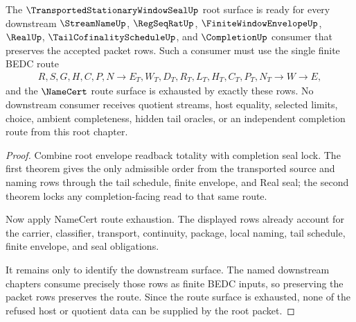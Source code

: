 \begin{theorem}
\label{thm:transported-stationary-window-seal-downstream-route-readiness}
The $\TransportedStationaryWindowSealUp$ root surface is ready for every downstream $\StreamNameUp$, $\RegSeqRatUp$, $\FiniteWindowEnvelopeUp$, $\RealUp$, $\TailCofinalityScheduleUp$, and $\CompletionUp$ consumer that preserves the accepted packet rows. Such a consumer must use the single finite BEDC route
$$
\begin{aligned}
  R,S,G,H,C,P,N
  \longrightarrow
  E_T,W_T,D_T,R_T,L_T,H_T,C_T,P_T,N_T
  \longrightarrow
  W
  \longrightarrow
  E ,
\end{aligned}
$$
and the $\NameCert$ route surface is exhausted by exactly these rows. No downstream consumer receives quotient streams, host equality, selected limits, choice, ambient completeness, hidden tail oracles, or an independent completion route from this root chapter.
\end{theorem}
\begin{proof}
Combine root envelope readback totality with completion seal lock. The first theorem gives the only admissible order from the transported source and naming rows through the tail schedule, finite envelope, and Real seal; the second theorem locks any completion-facing read to that same route.

Now apply NameCert route exhaustion. The displayed rows already account for the carrier, classifier, transport, continuity, package, local naming, tail schedule, finite envelope, and seal obligations.

It remains only to identify the downstream surface. The named downstream chapters consume precisely those rows as finite BEDC inputs, so preserving the packet rows preserves the route. Since the route surface is exhausted, none of the refused host or quotient data can be supplied by the root packet.
\end{proof}

